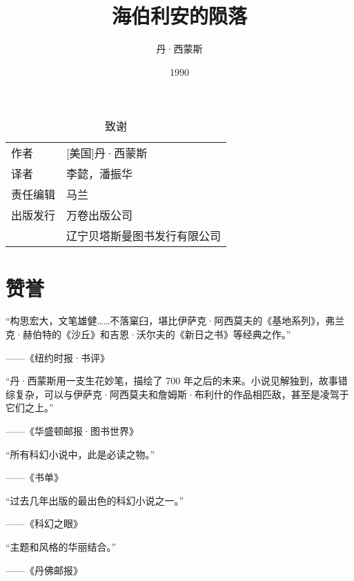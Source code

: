 \documentclass[AutoFakeBold=true]{book}
\title{海伯利安的陨落}
\author{丹·西蒙斯}
\date{1990}
\newenvironment{abstract}{}{}
\begin{document}
\maketitle
\pagestyle{empty}

\renewcommand{\abstractname}{}
\begin{abstract}
	\begin{table}[]
		\begin{center}
			\caption{致谢}
			\begin{tabular}{ll}
				{\heiti 作者} & [美国]丹·西蒙斯\\
				{\heiti 译者} & 李懿，潘振华\\
				{\heiti 责任编辑} & 马兰\\
				{\heiti 出版发行} & 万卷出版公司\\&辽宁贝塔斯曼图书发行有限公司\\
			\end{tabular}
		\end{center}
	\end{table}
\end{abstract}

\section*{赞誉}

``构思宏大，文笔雄健……不落窠臼，堪比伊萨克·阿西莫夫的《基地系列》，弗兰克·赫伯特的《沙丘》和吉恩·沃尔夫的《新日之书》等经典之作。''\begin{flushright}{\heiti ——《纽约时报·书评》}\end{flushright}

``丹·西蒙斯用一支生花妙笔，描绘了 700 年之后的未来。小说见解独到，故事错综复杂，可以与伊萨克·阿西莫夫和詹姆斯·布利什的作品相匹敌，甚至是凌驾于它们之上。''\begin{flushright}{\heiti ——《华盛顿邮报·图书世界》}\end{flushright}

``所有科幻小说中，此是必读之物。''\begin{flushright}{\heiti ——《书单》}\end{flushright}

``过去几年出版的最出色的科幻小说之一。''\begin{flushright}{\heiti ——《科幻之眼》}\end{flushright}

``主题和风格的华丽结合。''\begin{flushright}{\heiti ——《丹佛邮报》}\end{flushright}
\end{document}

